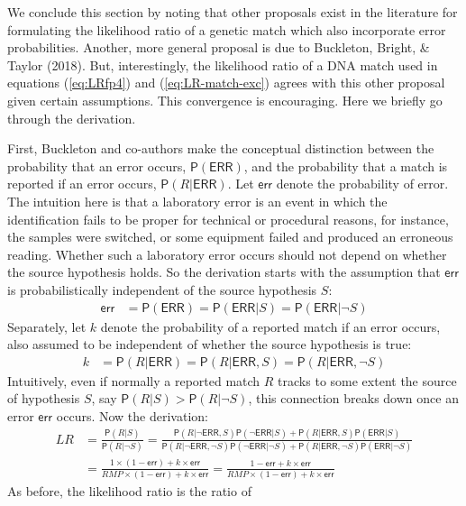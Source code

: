 \documentclass[
  10pt,
  dvipsnames,enabledeprecatedfontcommands]{scrartcl}
\newcommand{\n}{\neg}
\newcommand{\pr}[1]{\mathsf{P}(#1)}
\begin{document}
We conclude this section by noting that other proposals exist in the
literature for formulating the likelihood ratio of a genetic match which
also incorporate error probabilities. Another, more general proposal is
due to Buckleton, Bright, \& Taylor (2018). But, interestingly, the
likelihood ratio of a DNA match used in equations (\ref{eq:LRfp4}) and
(\ref{eq:LR-match-exc}) agrees with this other proposal given certain
assumptions. This convergence is encouraging. Here we briefly go through
the derivation.

First, Buckleton and co-authors make the conceptual distinction between
the probability that an error occurs, \(\pr{\mathsf{ERR}}\), and the
probability that a match is reported if an error occurs,
\(\pr{R \vert \mathsf{ERR}}\). Let \(\mathsf{err}\) denote the
probability of error. The intuition here is that a laboratory error is
an event in which the identification fails to be proper for technical or
procedural reasons, for instance, the samples were switched, or some
equipment failed and produced an erroneous reading. Whether such a
laboratory error occurs should not depend on whether the source
hypothesis holds. So the derivation starts with the assumption that
\(\mathsf{err}\) is probabilistically independent of the source
hypothesis \(S\):\\
\begin{align*}
\mathsf{err} & = \pr{\mathsf{ERR}} = \pr{\mathsf{ERR} \vert S} = \pr{\mathsf{ERR} \vert \n S}
\end{align*} \noindent  Separately, let \(k\) denote the probability of
a reported match if an error occurs, also assumed to be independent of
whether the source hypothesis is true: \begin{align*}
k & = \pr{R \vert \mathsf{ERR}} = \pr{R \vert \mathsf{ERR}, S} = \pr{R \vert \mathsf{ERR}, \n S}
\end{align*} \noindent  Intuitively, even if normally a reported match
\(R\) tracks to some extent the source of hypothesis \(S\), say
\(\pr{R \vert S}>\pr{R \vert \neg S}\), this connection breaks down once
an error \(\mathsf{err}\) occurs. Now the derivation: \begin{align*}
LR & = \frac{\pr{R\vert S}}
{\pr{R \vert \n S}} = \frac{\pr{R \vert \n \mathsf{ERR}, S}\pr{\n \mathsf{ERR} \vert S} + \pr{R \vert\mathsf{ERR}, S}\pr{\mathsf{ERR} \vert S}}
{\pr{R \vert \n \mathsf{ERR}, \n S}\pr {\n \mathsf{ERR} \vert \n S} + \pr{R \vert \mathsf{ERR}, \n S}\pr{\mathsf{ERR} \vert \n S}}\\
& = \frac{1\times (1-\mathsf{err}) + k\times \mathsf{err}}
{RMP\times (1-\mathsf{err})+k\times \mathsf{err}}  = \frac{1-\mathsf{err}+k\times \mathsf{err}}{RMP\times (1-\mathsf{err})+k\times \mathsf{err}}
\end{align*} \noindent As before, the likelihood ratio is the ratio of
\end{document}
